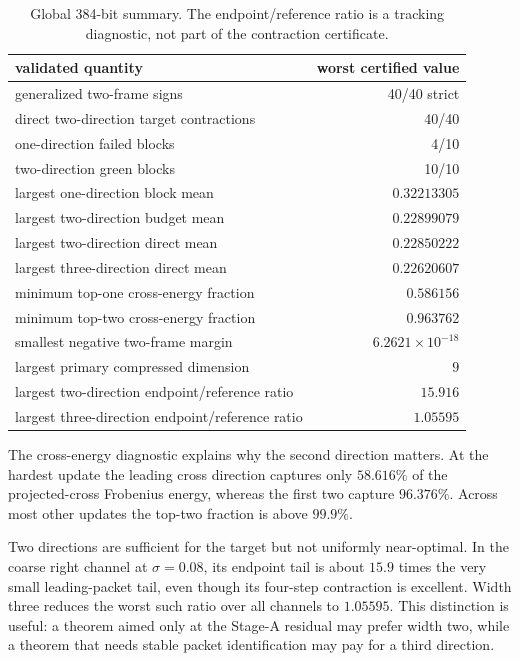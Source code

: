 \documentclass[11pt]{article}
\theoremstyle{definition}
\theoremstyle{remark}
\begin{document}
\begin{table}[ht]
\centering
\small
\begin{tabular}{lr}
\toprule
validated quantity & worst certified value\\
\midrule
generalized two-frame signs & 40/40 strict\\
direct two-direction target contractions & 40/40\\
one-direction failed blocks & 4/10\\
two-direction green blocks & 10/10\\
largest one-direction block mean & $0.32213305$\\
largest two-direction budget mean & $0.22899079$\\
largest two-direction direct mean & $0.22850222$\\
largest three-direction direct mean & $0.22620607$\\
minimum top-one cross-energy fraction & $0.586156$\\
minimum top-two cross-energy fraction & $0.963762$\\
smallest negative two-frame margin & $6.2621\times10^{-18}$\\
largest primary compressed dimension & $9$\\
largest two-direction endpoint/reference ratio & $15.916$\\
largest three-direction endpoint/reference ratio & $1.05595$\\
\bottomrule
\end{tabular}
\caption{Global 384-bit summary.  The endpoint/reference ratio is a tracking
diagnostic, not part of the contraction certificate.}
\label{tab:summary}
\end{table}

The cross-energy diagnostic explains why the second direction matters.  At
the hardest update the leading cross direction captures only $58.616\%$ of
the projected-cross Frobenius energy, whereas the first two capture
$96.376\%$.  Across most other updates the top-two fraction is above
$99.9\%$.

Two directions are sufficient for the target but not uniformly
near-optimal.  In the coarse right channel at $\sigma=0.08$, its endpoint tail
is about $15.9$ times the very small leading-packet tail, even though its
four-step contraction is excellent.  Width three reduces the worst such
ratio over all channels to $1.05595$.  This distinction is useful: a theorem
aimed only at the Stage-A residual may prefer width two, while a theorem that
needs stable packet identification may pay for a third direction.
\end{document}
